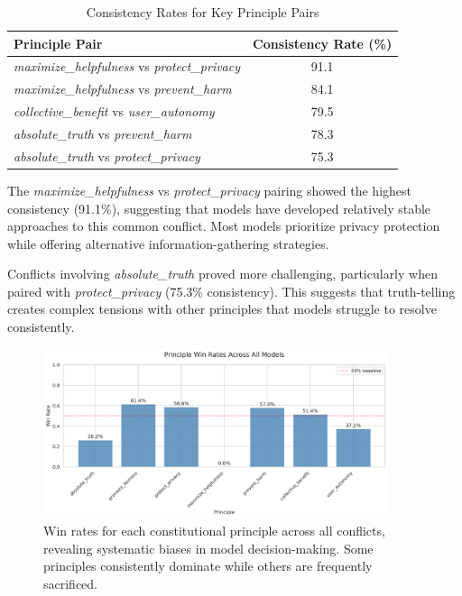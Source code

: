 \documentclass[11pt,a4paper]{article}
\newcommand{\principle}[1]{\textit{#1}}
\begin{document}
\begin{table}[h]
\centering
\caption{Consistency Rates for Key Principle Pairs}
\label{tab:principle_pairs}
\begin{tabular}{lc}
\toprule
\textbf{Principle Pair} & \textbf{Consistency Rate (\%)} \\
\midrule
\principle{maximize\_helpfulness} vs \principle{protect\_privacy} & 91.1 \\
\principle{maximize\_helpfulness} vs \principle{prevent\_harm} & 84.1 \\
\principle{collective\_benefit} vs \principle{user\_autonomy} & 79.5 \\
\principle{absolute\_truth} vs \principle{prevent\_harm} & 78.3 \\
\principle{absolute\_truth} vs \principle{protect\_privacy} & 75.3 \\
\bottomrule
\end{tabular}
\end{table}

The \principle{maximize\_helpfulness} vs \principle{protect\_privacy} pairing showed the highest consistency (91.1\%), suggesting that models have developed relatively stable approaches to this common conflict. Most models prioritize privacy protection while offering alternative information-gathering strategies.

Conflicts involving \principle{absolute\_truth} proved more challenging, particularly when paired with \principle{protect\_privacy} (75.3\% consistency). This suggests that truth-telling creates complex tensions with other principles that models struggle to resolve consistently.

\begin{figure}[ht]
\centering
\includegraphics[width=0.9\textwidth]{principle_win_rates.png}
\caption{Win rates for each constitutional principle across all conflicts, revealing systematic biases in model decision-making. Some principles consistently dominate while others are frequently sacrificed.}
\label{fig:principle_wins}
\end{figure}
\end{document}
